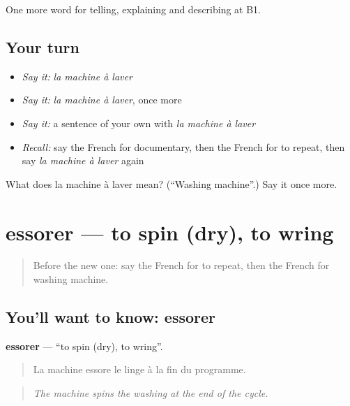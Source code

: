 \begin{grammarlens}[title={What you've built}]
One more word for telling, explaining and describing at B1.
\end{grammarlens}

\subsection*{Your turn}
\begin{itemize}
\raggedright
  \item \emph{Say it:} \emph{la machine à laver}
  \item \emph{Say it:} \emph{la machine à laver}, once more
  \item \emph{Say it:} a sentence of your own with \emph{la machine à laver}
  \item \emph{Recall:} say the French for documentary, then the French for to repeat, then say \emph{la machine à laver} again
\end{itemize}

\begin{tcolorbox}[breakable,colback=teal!4,colframe=teal!35!black,title={Before you move on}]
What does la machine à laver mean? (\textquotedblleft{}Washing machine\textquotedblright{}.) Say it once more.
\end{tcolorbox}
\section[essorer]{essorer — to spin (dry), to wring}

\label{lesson:FR-C526-essorer}



\begin{quote}
Before the new one: say the French for to repeat, then the French for washing machine.
\end{quote}

\subsection*{You'll want to know: essorer}
\textbf{essorer} — \textquotedblleft{}to spin (dry), to wring\textquotedblright{}.

\begin{quote}
La machine essore le linge à la fin du programme.
\end{quote}

\begin{quote}
\emph{The machine spins the washing at the end of the cycle.}
\end{quote}


